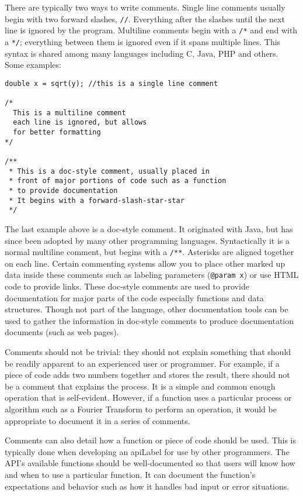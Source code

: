 There are typically two ways to write comments.  Single line
comments usually begin with two forward slashes, \texttt{//}.
Everything after the slashes until the next line is ignored 
by the program.  Multiline comments begin with a \texttt{/*}
and end with a \texttt{*/}; everything between them 
is ignored even if it spans multiple lines.  This syntax is shared
among many languages including C, Java, PHP and others.
Some examples:

\begin{verbatim}
double x = sqrt(y); //this is a single line comment

/*
  This is a multiline comment
  each line is ignored, but allows
  for better formatting
*/

/**
 * This is a doc-style comment, usually placed in
 * front of major portions of code such as a function
 * to provide documentation
 * It begins with a forward-slash-star-star
 */
\end{verbatim}

The last example above is a doc-style comment.  It originated
with Java, but has since been adopted by many other programming
languages.  Syntactically it is a normal multiline comment, but
begins with a \texttt{/**}.  Asterisks are aligned together
on each line.  Certain commenting systems allow you to place
other marked up data inside these comments such as labeling
parameters (\texttt{@param x}) or use HTML code
to provide links.  These doc-style comments are used to provide
documentation for major parts of the code especially functions
and data structures.  Though not part of the language, other
documentation tools can be used to gather the information in
doc-style comments to produce documentation documents (such
as web pages).

Comments should not be trivial: they should not explain something
that should be readily apparent to an experienced user or
programmer.  For example, if a piece of code adds two
numbers together and stores the result, there should not
be a comment that explains the process.  It is a simple and
common enough operation that is self-evident.  However,
if a function uses a particular process or algorithm such
as a Fourier Transform to perform an operation, it would
be appropriate to document it in a series of comments.

Comments can also detail how a function or piece of code
should be used.  This is typically done when developing an
\gls{apiLabel} for use by other programmers.  The API's
available functions should be well-documented so that users
will know how and when to use a particular function.  It
can document the function's expectations and behavior such
as how it handles bad input or error situations.

